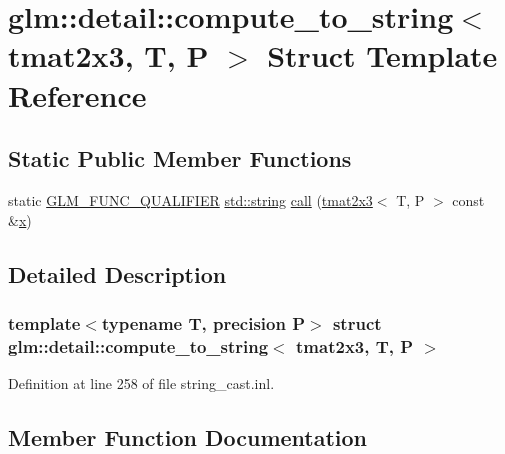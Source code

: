 \hypertarget{structglm_1_1detail_1_1compute__to__string_3_01tmat2x3_00_01_t_00_01_p_01_4}{}\section{glm\+::detail\+::compute\+\_\+to\+\_\+string$<$ tmat2x3, T, P $>$ Struct Template Reference}
\label{structglm_1_1detail_1_1compute__to__string_3_01tmat2x3_00_01_t_00_01_p_01_4}
\subsection*{Static Public Member Functions}
\begin{DoxyCompactItemize}
\item 
static \mbox{\hyperlink{setup_8hpp_a33fdea6f91c5f834105f7415e2a64407}{G\+L\+M\+\_\+\+F\+U\+N\+C\+\_\+\+Q\+U\+A\+L\+I\+F\+I\+ER}} \mbox{\hyperlink{glad_8h_ac83513893df92266f79a515488701770}{std\+::string}} \mbox{\hyperlink{structglm_1_1detail_1_1compute__to__string_3_01tmat2x3_00_01_t_00_01_p_01_4_a69b0cc0650365f45aaf4c5aba6819abc}{call}} (\mbox{\hyperlink{structglm_1_1tmat2x3}{tmat2x3}}$<$ T, P $>$ const \&\mbox{\hyperlink{glad_8h_a92d0386e5c19fb81ea88c9f99644ab1d}{x}})
\end{DoxyCompactItemize}


\subsection{Detailed Description}
\subsubsection*{template$<$typename T, precision P$>$\newline
struct glm\+::detail\+::compute\+\_\+to\+\_\+string$<$ tmat2x3, T, P $>$}



Definition at line 258 of file string\+\_\+cast.\+inl.



\subsection{Member Function Documentation}
\mbox{\label{structglm_1_1detail_1_1compute__to__string_3_01tmat2x3_00_01_t_00_01_p_01_4_a69b0cc0650365f45aaf4c5aba6819abc}} 
